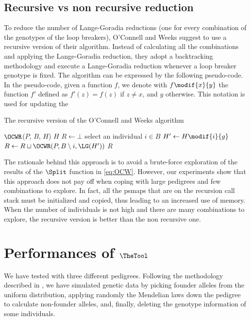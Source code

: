 \subsection{Recursive vs non recursive reduction}
\label{sec:recursive-vs-non}
To reduce the number of Lange-Goradia reductions (one for every combination of
the genotypes of the loop breakers), O'Connell and Weeks suggest to use a
recursive version of their algorithm. Instead of calculating all the
combinations and applying the Lange-Goradia reduction, they adopt a backtracking
methodology and execute a Lange-Goradia reduction whenever a loop breaker
genotype is fixed. The algorithm can be
expressed by the following pseudo-code. In the pseudo-code, given a function $f$, we denote with $f\modif{x}{y}$ the
function $f'$ defined as $f'(z)=f(z)$ if $z \neq x$, and $y$ otherwise. This notation is used for updating the  
\begin{algorithm}
  \caption{The recursive version of the O'Connell and Weeks algorithm}
  \begin{algorithmic}[1]
    \STATE $\OCWR$($P$, $B$, $H$) 
    \RETURN $H$ 
    \ELSE 
       \STATE $R \leftarrow \bot$ 
       \STATE select an individual $i \in B$ 
           \STATE $H' \leftarrow H \modif{i}{g}$ 
           \STATE $R \leftarrow R \sqcup {\OCWR(P, B\setminus i , \LG(H'))}$
       \ENDFOR
       \RETURN $R$
    \ENDIF
  \end{algorithmic}
\end{algorithm}
The rationale behind this approach is to avoid a brute-force exploration of the
results of the $\Split$ function in \eqref{eq:OCW}. However, our experiments
show that this approach does not pay off when coping with large pedigrees and
few combinations to explore. In fact, all the psmaps that are on the recursion
call stack must be initialized and copied, thus leading to an increased use of
memory. When the number of individuals is not high and there are many
combinations to explore, the recursive version is better than the non recursive
one.


\section{Performances of {$\TheTool$}}
\label{sec:performances-thetool}

We have tested {\TheTool} with three different pedigrees. Following the
methodology described in \cite{Pirinen2006}, we have simulated genetic data by
picking founder alleles from the uniform distribution, applying randomly
the Mendelian laws down the pedigree to calculate non-founder alleles, and,
finally, deleting the genotype information of some individuals. 

